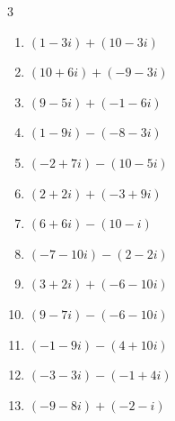 \begin{multicols}{3}
\begin{enumerate}
        \phantom{$\displaystyle =-12i$}

  \item $\displaystyle (1-3i) + (10-3i)$

        \phantom{$\displaystyle =11-6i$}

  \item $\displaystyle (10+6i) + (-9-3i)$

        \phantom{$\displaystyle =1+3i$}

  \item $\displaystyle (9-5i) + (-1-6i)$

        \phantom{$\displaystyle =8-11i$}

  \item $\displaystyle (1-9i) - (-8-3i)$

        \phantom{$\displaystyle =9-6i$}

  \item $\displaystyle (-2+7i) - (10-5i)$

        \phantom{$\displaystyle =-12+12i$}

  \item $\displaystyle (2+2i) + (-3+9i)$

        \phantom{$\displaystyle =-1+11i$}

  \item $\displaystyle (6+6i) - (10-i)$

        \phantom{$\displaystyle =-4+7i$}

  \item $\displaystyle (-7-10i) - (2-2i)$

        \phantom{$\displaystyle =-9-8i$}

  \item $\displaystyle (3+2i) + (-6-10i)$

        \phantom{$\displaystyle =-3-8i$}

  \item $\displaystyle (9-7i) - (-6-10i)$

        \phantom{$\displaystyle =15+3i$}

  \item $\displaystyle (-1-9i) - (4+10i)$

        \phantom{$\displaystyle =-5-19i$}

  \item $\displaystyle (-3-3i) - (-1+4i)$

        \phantom{$\displaystyle =-2-7i$}

  \item $\displaystyle (-9-8i) + (-2-i)$


\end{enumerate}
\end{multicols}
